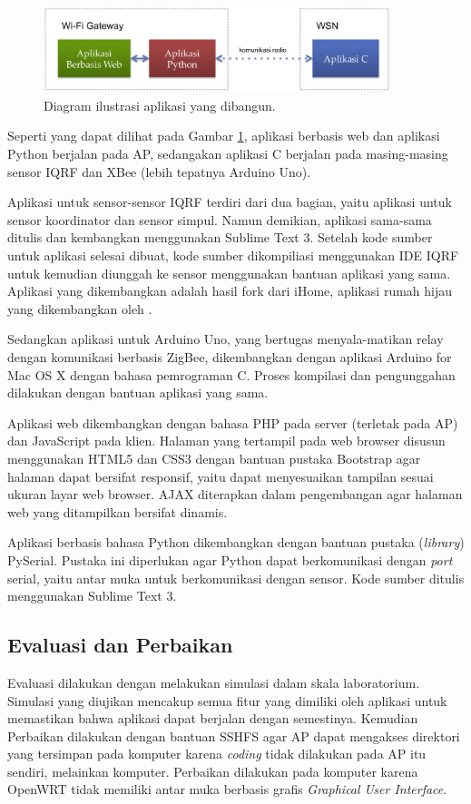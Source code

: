 			\begin{figure}[H]
			  \centering
			    \includegraphics[width=0.9\textwidth]{gambar/aplikasi}
			    \caption{Diagram ilustrasi aplikasi yang dibangun.}
			    \label{aplikasi}
			\end{figure}

		Seperti yang dapat dilihat pada Gambar \ref{aplikasi}, aplikasi berbasis web dan aplikasi Python berjalan pada AP, sedangakan aplikasi C berjalan pada masing-masing sensor IQRF dan XBee (lebih tepatnya Arduino Uno).

		Aplikasi untuk sensor-sensor IQRF terdiri dari dua bagian, yaitu aplikasi untuk sensor koordinator dan sensor simpul. Namun demikian, aplikasi sama-sama ditulis dan kembangkan menggunakan Sublime Text 3. Setelah kode sumber untuk aplikasi selesai dibuat, kode sumber dikompiliasi menggunakan IDE IQRF untuk kemudian diunggah ke sensor menggunakan bantuan aplikasi yang sama. Aplikasi yang dikembangkan adalah hasil fork dari iHome, aplikasi rumah hijau yang dikembangkan oleh \cite{widyawan2012ihome}.

		Sedangkan aplikasi untuk Arduino Uno, yang bertugas menyala-matikan relay dengan komunikasi berbasis ZigBee, dikembangkan dengan aplikasi Arduino for Mac OS X dengan bahasa pemrograman C. Proses kompilasi dan pengunggahan dilakukan dengan bantuan aplikasi yang sama.

		Aplikasi web dikembangkan dengan bahasa PHP pada server (terletak pada AP) dan JavaScript pada klien. Halaman yang tertampil pada web browser disusun menggunakan HTML5 dan CSS3 dengan bantuan pustaka Bootstrap agar halaman dapat bersifat responsif, yaitu dapat menyesuaikan tampilan sesuai ukuran layar web browser. AJAX diterapkan dalam pengembangan agar halaman web yang ditampilkan bersifat dinamis.

		Aplikasi berbasis bahasa Python dikembangkan dengan bantuan pustaka (\emph{library}) PySerial. Pustaka ini diperlukan agar Python dapat berkomunikasi dengan \emph{port} serial, yaitu antar muka untuk berkomunikasi dengan sensor. Kode sumber ditulis menggunakan Sublime Text 3.

	\subsection{Evaluasi dan Perbaikan}
		Evaluasi dilakukan dengan melakukan simulasi dalam skala laboratorium. Simulasi yang diujikan mencakup semua fitur yang dimiliki oleh aplikasi untuk memastikan bahwa aplikasi dapat berjalan dengan semestinya. Kemudian Perbaikan dilakukan dengan bantuan SSHFS agar AP dapat mengakses direktori yang tersimpan pada komputer karena \emph{coding} tidak dilakukan pada AP itu sendiri, melainkan komputer. Perbaikan dilakukan pada komputer karena OpenWRT tidak memiliki antar muka berbasis grafis \emph{Graphical User Interface}.

